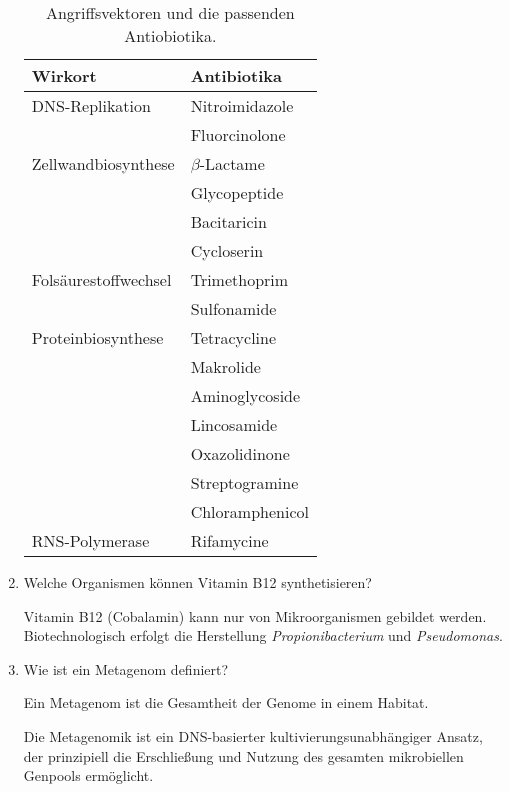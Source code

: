 \begin{enumerate}
		\begin{table}[ht!]
		\begin{center}
			\begin{tabular}{p{4cm} p{3cm}} 
		\toprule
			Wirkort	&	Antibiotika \\
			\midrule
			DNS-Replikation		&	Nitroimidazole \\
										&	Fluorcinolone 	\\
			Zellwandbiosynthese	&	\begin{math}\beta\end{math}-Lactame \\
			\multirow{3}{*}{}		&	Glycopeptide 	\\
										&	Bacitaricin 	\\
										&	Cycloserin 		\\
			Folsäurestoffwechsel	&	Trimethoprim	\\
										&	Sulfonamide 	\\
			Proteinbiosynthese	&	Tetracycline \\
			\multirow{5}{*}{}		&	Makrolide 	\\
										&	Aminoglycoside 	\\
										&	Lincosamide 	\\
										&	Oxazolidinone 	\\
										&	Streptogramine 	\\
										&	Chloramphenicol 	\\
			RNS-Polymerase			&	Rifamycine \\
		\bottomrule
		\end{tabular}
		\label{tab:wirkorteantibiose}
		\caption{Angriffsvektoren und die passenden Antiobiotika.}
		\end{center}
		\end{table}

	\item Welche Organismen können Vitamin B12 synthetisieren?

		Vitamin B12 (Cobalamin) kann nur von Mikroorganismen gebildet werden.
		Biotechnologisch erfolgt die Herstellung \emph{Propionibacterium} und \emph{Pseudomonas}.
	
	\item Wie ist ein Metagenom definiert?

		Ein Metagenom ist die Gesamtheit der Genome in einem Habitat.
		
		Die Metagenomik ist ein DNS-basierter kultivierungsunabhängiger Ansatz,
		der prinzipiell die Erschließung und Nutzung des gesamten mikrobiellen Genpools ermöglicht.


\end{enumerate}
